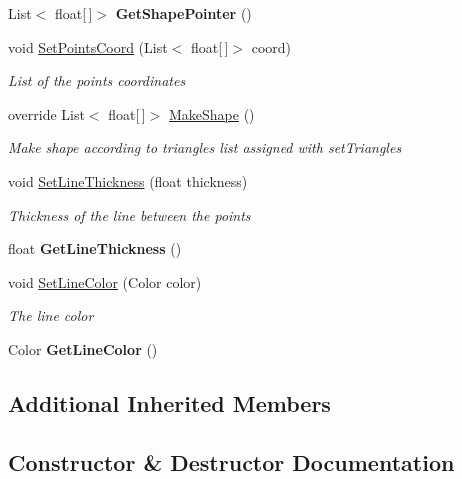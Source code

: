 \begin{DoxyCompactItemize}
List$<$ float\mbox{[}$\,$\mbox{]}$>$ {\bfseries Get\+Shape\+Pointer} ()
\item 
void \mbox{\hyperlink{class_space_v_i_l_1_1_points_container_abcf47862e61ce7aea7992ced4258da2c}{Set\+Points\+Coord}} (List$<$ float\mbox{[}$\,$\mbox{]}$>$ coord)
\begin{DoxyCompactList}\small\item\em List of the points coordinates \end{DoxyCompactList}\item 
override List$<$ float\mbox{[}$\,$\mbox{]}$>$ \mbox{\hyperlink{class_space_v_i_l_1_1_points_container_a7fd8cf39e463780c871d538b884a3fdb}{Make\+Shape}} ()
\begin{DoxyCompactList}\small\item\em Make shape according to triangles list assigned with set\+Triangles \end{DoxyCompactList}\item 
void \mbox{\hyperlink{class_space_v_i_l_1_1_points_container_a451c8c1e3a88e205d777e7a4cfe46f97}{Set\+Line\+Thickness}} (float thickness)
\begin{DoxyCompactList}\small\item\em Thickness of the line between the points \end{DoxyCompactList}\item 
\mbox{\label{class_space_v_i_l_1_1_points_container_ac0de00bb61b2f72b9c5c45499cfc7ff8}} 
float {\bfseries Get\+Line\+Thickness} ()
\item 
void \mbox{\hyperlink{class_space_v_i_l_1_1_points_container_a8e72d762905dd7f4a8d27863a36be99c}{Set\+Line\+Color}} (Color color)
\begin{DoxyCompactList}\small\item\em The line color \end{DoxyCompactList}\item 
\mbox{\label{class_space_v_i_l_1_1_points_container_a588fa56f99bee63af3b0262787577ac1}} 
Color {\bfseries Get\+Line\+Color} ()
\end{DoxyCompactItemize}
\subsection*{Additional Inherited Members}


\subsection{Constructor \& Destructor Documentation}
\mbox{\label{class_space_v_i_l_1_1_points_container_ac769a83ca0591540c776169c376446a3}} 
